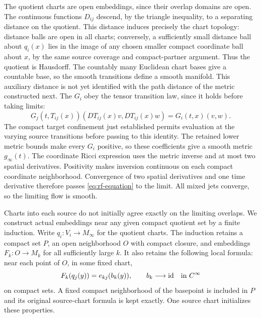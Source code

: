 The quotient charts are open embeddings, since their overlap domains
are open.  The continuous functions $D_{ij}$ descend, by the triangle
inequality, to a separating distance on the quotient.  This distance
induces precisely the chart topology: distance balls are open in all
charts; conversely, a sufficiently small distance ball about $q_i(x)$
lies in the image of any chosen smaller compact coordinate ball about
$x$, by the same source coverage and compact-partner argument.
Thus the quotient is Hausdorff.  The countably many Euclidean chart
bases give a countable base, so the smooth transitions define a
smooth manifold.  This auxiliary distance is not yet identified with
the path distance of the metric constructed next.
The $G_i$ obey the tensor transition law, since it holds before taking
limits:
\[
 G_j(t,T_{ij}(x))(DT_{ij}(x)v,DT_{ij}(x)w)=G_i(t,x)(v,w).
\]
The compact target confinement just established permits evaluation
at the varying source transitions before passing to this identity.
The retained lower metric bounds make every $G_i$ positive, so these
coefficients give a smooth metric $g_\infty(t)$.  The coordinate
Ricci expression uses the metric inverse and at most two spatial
derivatives.  Positivity makes inversion continuous on each compact
coordinate neighborhood.  Convergence of two spatial derivatives and
one time derivative therefore passes
\eqref{eq:rf-equation} to the limit.  All mixed jets converge, so the
limiting flow is smooth.

Charts into each source do not initially agree exactly on the limiting
overlaps.  We construct actual embeddings near any given compact
quotient set by a finite induction.  Write $q_i:V_i\to M_\infty$
for the quotient charts.  The induction retains a compact set $P$,
an open neighborhood $O$ with compact closure, and embeddings
$F_k:O\to M_k$ for all sufficiently large $k$.  It also retains the
following local formula: near each point of $O$, in some fixed chart,
\[
             F_k(q_j(y))=e_{kj}(b_k(y)),
             \qquad b_k\longrightarrow\mathrm{id}\quad\hbox{in }C^\infty
\]
on compact sets.  A fixed compact neighborhood of the basepoint is
included in $P$ and its original source-chart formula is kept exactly.
One source chart initializes these properties.

